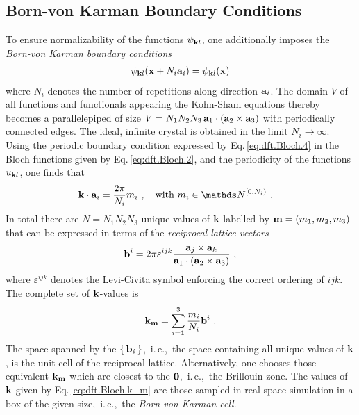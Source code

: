 \subsection{Born-von Karman Boundary Conditions}
To ensure normalizability of the functions $\psi_{{\bf k}l}$, one additionally imposes the \emph{Born-von Karman boundary conditions}
\begin{align}
	\psi_{{\bf k}l} ({\bf x} + N_i {\bf a}_i) 
		= \psi_{{\bf k}l} ({\bf x})
	\label{eq:dft.Bloch.4}
\end{align}
where $N_i$ denotes the number of repetitions along direction ${\bf a}_i$. The domain $V$ of all functions and functionals appearing the Kohn-Sham equations thereby becomes a parallelepiped of size 
$V = N_1 N_2 N_3 \, {\bf a}_1 \cdot ({\bf a}_2 \times {\bf a}_3)$ with periodically connected edges. The ideal, infinite crystal is obtained in the limit $N_i \rightarrow \infty$.
Using the periodic boundary condition expressed by Eq.\,\eqref{eq:dft.Bloch.4} in the Bloch functions given by Eq.\,\eqref{eq:dft.Bloch.2}, and the periodicity of the functions $u_{{\bf k} l}$, one finds that
\begin{align}
		{\bf k} \cdot {\bf a}_i
			&= \frac{2 \pi}{N_i} m_i~,\quad\text{with } m_i \in \mathds N^{[0, N_i)}~.
	\label{eq:dft.Bloch.5}
\end{align}
In total there are $N = N_1 N_2 N_3$ unique values of $\bf k$ labelled by ${\bf m} = (m_1, m_2, m_3)$ that can be expressed in terms of the \emph{reciprocal lattice vectors}~\cite{Sands2002}
\begin{align}
	{\bf b}^i 
		= 2 \pi \varepsilon^{ijk} \frac{{\bf a}_j \times {\bf a}_k}{{\bf a}_1 \cdot ({\bf a}_2 \times {\bf a}_3)} ~,
	\label{eq:dft.Bloch.bi}
\end{align}
where $\varepsilon^{ijk}$ denotes the Levi-Civita symbol enforcing the correct ordering of $ijk$. The complete set of $\bf k$-values is
\begin{align}
	{\bf k}_{\bf m} 
		= \sum_{i=1}^3 \frac{m_i}{N_i} {\bf b}^i~.
	\label{eq:dft.Bloch.k_m}
\end{align}
The space spanned by the $\set{{\bf b}_i}$,~i.\,e.,~the space containing all unique values of ${\bf k}$, is the unit cell of the reciprocal lattice. Alternatively, one chooses those equivalent $\bf k_m$ which are closest to the $\bf 0$,~i.\,e.,~the Brillouin zone. The values of $\bf k$ given by Eq.\,\eqref{eq:dft.Bloch.k_m} are those sampled in real-space simulation in a box of the given size,~i.\,e.,~the \emph{Born-von Karman cell}.

